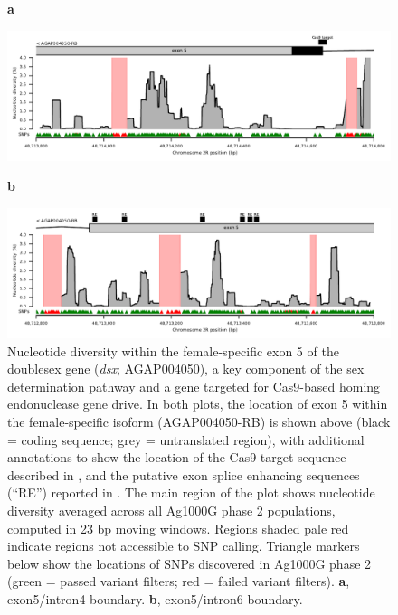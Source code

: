 \documentclass[a4paper,11pt,abstracton,hidelinks]{scrartcl}
\begin{document}
\begin{figure}[H]
    \textbf{a}
	\begin{center}
        \includegraphics[width=1.0\linewidth]{artwork/dsx_a.pdf}
	\end{center}
    \textbf{b}
	\begin{center}
        \includegraphics[width=1.0\linewidth]{artwork/dsx_b.pdf}
	\end{center}
    \caption{%
    Nucleotide diversity within the female-specific exon 5 of the doublesex gene (\textit{dsx}; AGAP004050), a key component of the sex determination pathway and a gene targeted for Cas9-based homing endonuclease gene drive.
    In both plots, the location of exon 5 within the female-specific isoform (AGAP004050-RB) is shown above (black = coding sequence; grey = untranslated region), with additional annotations to show the location of the Cas9 target sequence described in \cite{kyrou2018}, and the putative exon splice enhancing sequences (``RE'') reported in \cite{Scali2005}.
    The main region of the plot shows nucleotide diversity averaged across all Ag1000G phase 2 populations, computed in 23 bp moving windows.
    Regions shaded pale red indicate regions not accessible to SNP calling.
    Triangle markers below show the locations of SNPs discovered in Ag1000G phase 2 (green = passed variant filters; red = failed variant filters).
    \textbf{a}, exon5/intron4 boundary.
    \textbf{b}, exon5/intron6 boundary.
}
    \label{fig:dsx}
\end{figure}


\clearpage
\end{document}
